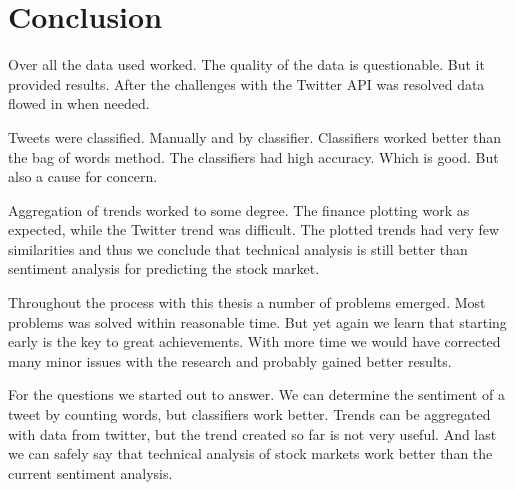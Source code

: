 \chapter{Conclusion}\label{conclusion}

Over all the data used worked. The quality of the data is questionable. But it
provided results. After the challenges with the Twitter API was resolved data
flowed in when needed.  

Tweets were classified. Manually and by classifier. Classifiers worked better
than the bag of words method. The classifiers had high accuracy. Which is good.
But also a cause for concern. 

Aggregation of trends worked to some degree. The finance plotting work as
expected, while the Twitter trend was difficult. The plotted trends had very
few similarities and thus we conclude that technical analysis is still better
than sentiment analysis for predicting the stock market.  

Throughout the process with this thesis a number of problems emerged. Most
problems was solved within reasonable time. But yet again we learn that
starting early is the key to great achievements. With more time we would have
corrected many minor issues with the research and probably gained better
results.  

For the questions we started out to answer. We can determine the sentiment of a
tweet by counting words, but classifiers work better. Trends can be aggregated
with data from twitter, but the trend created so far is not very useful. And
last we can safely say that technical analysis of stock markets work better
than the current sentiment analysis. 
